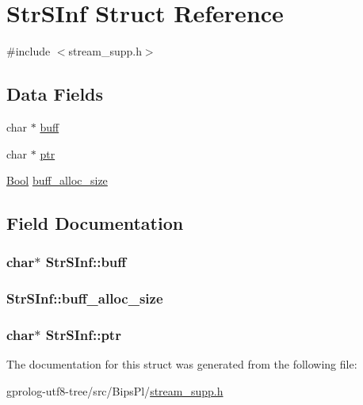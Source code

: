 \hypertarget{structStrSInf}{}\section{Str\+S\+Inf Struct Reference}
\label{structStrSInf}


{\ttfamily \#include $<$stream\+\_\+supp.\+h$>$}

\subsection*{Data Fields}
\begin{DoxyCompactItemize}
\item 
char $\ast$ \hyperlink{structStrSInf_aeb057f9f00adf6340a825b3a5f5d2f85}{buff}
\item 
char $\ast$ \hyperlink{structStrSInf_a68da0c71b6666b73881d68d364de63f2}{ptr}
\item 
\hyperlink{bool_8h_afdcfe6db5bea87bd493a3fe2c513d5ef}{Bool} \hyperlink{structStrSInf_af4eb3705492f95c32af035b64b070958}{buff\+\_\+alloc\+\_\+size}
\end{DoxyCompactItemize}


\subsection{Field Documentation}
\subsubsection[{\texorpdfstring{buff}{buff}}]{\setlength{\rightskip}{0pt plus 5cm}char$\ast$ Str\+S\+Inf\+::buff}\hypertarget{structStrSInf_aeb057f9f00adf6340a825b3a5f5d2f85}{}\label{structStrSInf_aeb057f9f00adf6340a825b3a5f5d2f85}
\subsubsection[{\texorpdfstring{buff\+\_\+alloc\+\_\+size}{buff_alloc_size}}]{ Str\+S\+Inf\+::buff\+\_\+alloc\+\_\+size}\hypertarget{structStrSInf_af4eb3705492f95c32af035b64b070958}{}\label{structStrSInf_af4eb3705492f95c32af035b64b070958}
\subsubsection[{\texorpdfstring{ptr}{ptr}}]{\setlength{\rightskip}{0pt plus 5cm}char$\ast$ Str\+S\+Inf\+::ptr}\hypertarget{structStrSInf_a68da0c71b6666b73881d68d364de63f2}{}\label{structStrSInf_a68da0c71b6666b73881d68d364de63f2}


The documentation for this struct was generated from the following file\+:\begin{DoxyCompactItemize}
\item 
gprolog-\/utf8-\/tree/src/\+Bips\+Pl/\hyperlink{stream__supp_8h}{stream\+\_\+supp.\+h}\end{DoxyCompactItemize}
